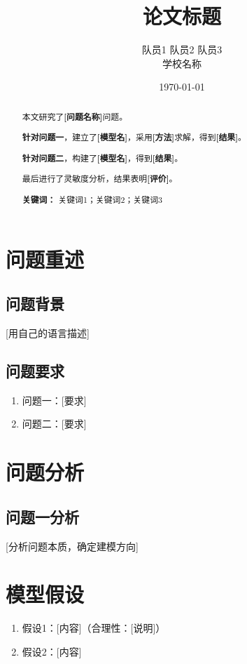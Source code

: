 \documentclass[12pt,a4paper]{article}
\begin{document}
\title{\textbf{论文标题}}
\author{队员1 \quad 队员2 \quad 队员3 \\ \small 学校名称}
\date{\today}
\maketitle

\begin{abstract}
本文研究了\textbf{[问题名称]}问题。

\textbf{针对问题一}，建立了\textbf{[模型名]}，采用\textbf{[方法]}求解，得到\textbf{[结果]}。

\textbf{针对问题二}，构建了\textbf{[模型名]}，得到\textbf{[结果]}。

最后进行了灵敏度分析，结果表明\textbf{[评价]}。

\bigskip
\noindent\textbf{关键词：} 关键词1；关键词2；关键词3
\end{abstract}

\tableofcontents
\newpage

\section{问题重述}
\subsection{问题背景}
[用自己的语言描述]

\subsection{问题要求}
\begin{enumerate}
    \item 问题一：[要求]
    \item 问题二：[要求]
\end{enumerate}

\section{问题分析}
\subsection{问题一分析}
[分析问题本质，确定建模方向]

\section{模型假设}
\begin{enumerate}
    \item 假设1：[内容]（合理性：[说明]）
    \item 假设2：[内容]
\end{enumerate}
\end{document}
